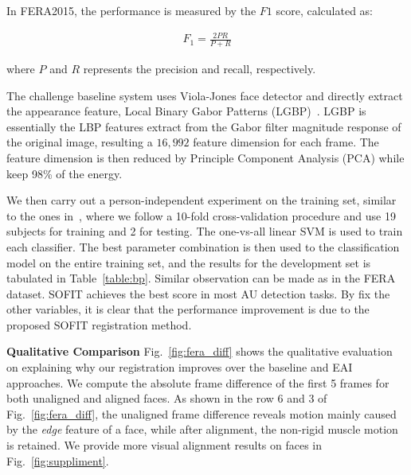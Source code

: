 \documentclass[review]{elsarticle}
\begin{document}
In FERA2015, the performance is measured by the $F1$ score, calculated as:

\begin{align}
F_1 = \frac{2PR}{P+R}
\end{align}

\noindent where $P$ and $R$ represents the precision and recall, respectively.

The challenge baseline system uses Viola-Jones face detector and directly extract the appearance feature, Local Binary Gabor Patterns (LGBP)~\cite{LGBP}. LGBP is essentially the LBP features extract from the Gabor filter magnitude response of the original image, resulting a $16,992$ feature dimension for each frame. The feature dimension is then reduced by Principle Component Analysis (PCA) while keep 98\% of the energy. 

We then carry out a person-independent experiment on the training set, similar to the ones in~\cite{BP4D,FERA15}, where we follow a 10-fold cross-validation procedure and use 19 subjects for training and 2 for testing. The one-vs-all linear SVM is used to train each classifier. The best parameter combination is then used to the classification model on the entire training set, and the results for the development set is tabulated in Table~\ref{table:bp}. Similar observation can be made as in the FERA dataset. SOFIT achieves the best score in most AU detection tasks. By fix the other variables, it is clear that the performance improvement is due to the proposed SOFIT registration method.




\noindent \textbf{Qualitative Comparison}
Fig.~\ref{fig:fera_diff} shows the qualitative evaluation on explaining why our registration improves over the baseline and EAI approaches. We compute the absolute frame difference of the first 5 frames for both unaligned and aligned faces. As shown in the row 6 and 3 of Fig.~\ref{fig:fera_diff}, the unaligned frame difference reveals motion mainly caused by the \textit{edge} feature of a face, while after alignment, the non-rigid muscle motion is retained. We provide more visual alignment results on faces in Fig.~\ref{fig:suppliment}.
\end{document}
